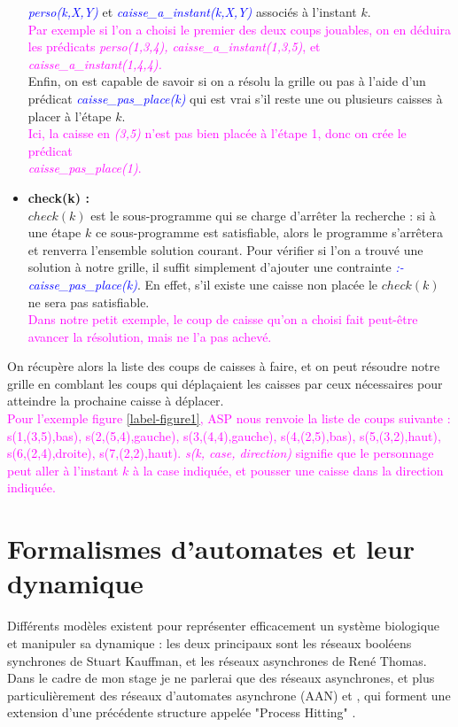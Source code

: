 \documentclass[12pt,a4paper]{article}
\begin{document}
\begin{itemize}
		\emph{\textcolor{blue}{perso(k,X,Y)}} et \emph{\textcolor{blue}{caisse\_a\_instant(k,X,Y)}} associés à l'instant $k$.\\
		\textcolor{magenta}{Par exemple si l'on a choisi le premier des deux coups jouables, on en déduira les prédicats \emph{perso(1,3,4), caisse\_a\_instant(1,3,5)}, et \emph{caisse\_a\_instant(1,4,4).}}\\
		Enfin, on est capable de savoir si on a résolu la grille ou pas à l'aide d'un prédicat \emph{\textcolor{blue}{caisse\_pas\_place(k)}} qui est vrai s'il reste une ou plusieurs caisses à placer à l'étape $k$.\\
		\textcolor{magenta}{Ici, la caisse en \emph{(3,5)} n'est pas bien placée à l'étape 1, donc on crée le prédicat \\
		\emph{caisse\_pas\_place(1)}.}\\
	\item \textbf{check(k) :}\\
		$check(k)$ est le sous-programme qui se charge d'arrêter la recherche : si à une étape $k$ ce sous-programme est satisfiable, alors le programme s'arrêtera et renverra l'ensemble solution courant. Pour vérifier si 
		l'on a trouvé une solution à notre grille, il suffit simplement d'ajouter une contrainte \emph{\textcolor{blue}{:- caisse\_pas\_place(k)}}. En effet, s'il existe une caisse non placée le $check(k)$ ne sera pas 
		satisfiable.\\
		\textcolor{magenta}{Dans notre petit exemple, le coup de caisse qu'on a choisi fait peut-être avancer la résolution, mais ne l'a pas achevé.}\\
\end{itemize}
On récupère alors la liste des coups de caisses à faire, et on peut résoudre notre grille en comblant les coups qui déplaçaient les caisses par ceux nécessaires pour atteindre la prochaine caisse à déplacer.\\
\textcolor{magenta}{Pour l'exemple figure \ref{label-figure1}, ASP nous renvoie la liste de coups suivante : s(1,(3,5),bas), s(2,(5,4),gauche), s(3,(4,4),gauche), s(4,(2,5),bas), s(5,(3,2),haut), s(6,(2,4),droite), s(7,(2,2),haut). 
\emph{s(k, case, direction)} signifie que le personnage peut aller à l'instant $k$ à la case indiquée, et pousser une caisse dans la direction indiquée.}

\section{Formalismes d'automates et leur dynamique}
Différents modèles existent pour représenter efficacement un système biologique et manipuler sa dynamique : les deux principaux sont les réseaux booléens synchrones de Stuart Kauffman, et les réseaux asynchrones de René Thomas.
Dans le cadre de mon stage je ne parlerai que des réseaux asynchrones, et plus particulièrement des réseaux d'automates asynchrone (AAN) \cite{folschette2015sufficient} et \cite{pauleve2016pint}, qui forment une extension d'une précédente structure appelée "Process Hitting" \cite{pauleve14}.\\
\end{document}
